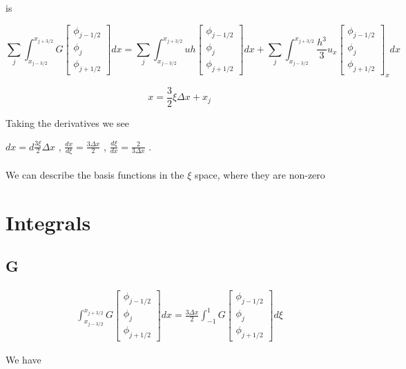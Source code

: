 \documentclass[12pt]{article}
\begin{document}
is 

\[\sum_{j}\int_{x_{j-3/2}}^{x_{j+3/2}}G\left[\begin{array}{c}\phi_{j-1/2} \\\phi_{j}\\\phi_{j+1/2} \end{array}\right]  dx = \sum_{j}\int_{x_{j-3/2}}^{x_{j+3/2}} uh \left[\begin{array}{c}\phi_{j-1/2} \\\phi_{j}\\\phi_{j+1/2} \end{array}\right] dx + \sum_{j}\int_{x_{j-3/2}}^{x_{j+3/2}}\frac{h^3}{3}u_{x}\left[\begin{array}{c}\phi_{j-1/2} \\\phi_{j}\\\phi_{j+1/2} \end{array}\right]_xdx\]


$$x = \frac{3}{2}\xi\Delta x + x_{j}$$

Taking the derivatives we see


$dx = d\frac{3\xi}{2}\Delta x$ , $\frac{dx}{d\xi} = \frac{3\Delta x}{2}$ , $\frac{d\xi}{dx} = \frac{2}{3\Delta x}$ . \\ \\ We can describe the basis functions in the $\xi$ space, where they are non-zero

\section{Integrals}

\subsection{G}

\begin{multline}
\int_{x_{j-3/2}}^{x_{j+3/2}}G\left[\begin{array}{c}\phi_{j-1/2} \\\phi_{j}\\\phi_{j+1/2} \end{array}\right]  dx =  \frac{3 \Delta x}{2}\int_{-1}^{1} G\left[\begin{array}{c}\phi_{j-1/2} \\\phi_{j}\\\phi_{j+1/2} \end{array}\right]  d \xi
\end{multline}

We have 
\end{document}
